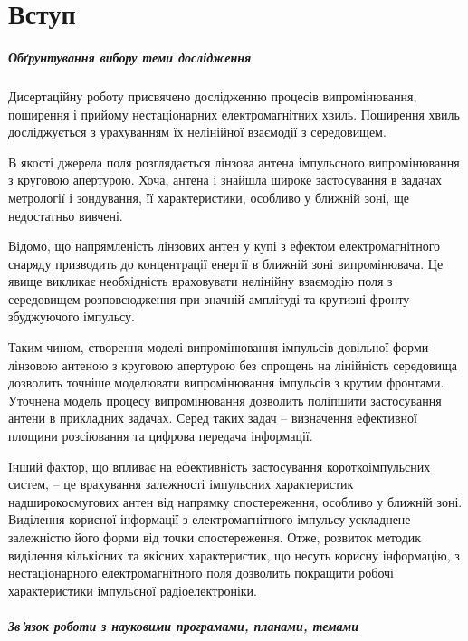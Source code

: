 \chapter*{Вступ}

\paragraph{Обґрунтування вибору теми дослідження}

Дисертаційну роботу присвячено дослідженню процесів випромінювання, поширення 
і прийому нестаціонарних електромагнітних хвиль. Поширення хвиль досліджується 
з урахуванням їх нелінійної взаємодії з середовищем. 

В якості джерела поля розглядається лінзова антена імпульсного випромінювання 
з круговою апертурою. Хоча, антена і знайшла широке застосування в задачах 
метрології і зондування, її характеристики, особливо у ближній зоні, 
ще недостатньо вивчені.

Відомо, що напрямленість лінзових антен у купі з ефектом електромагнітного 
снаряду призводить до концентрації енергії в ближній зоні випромінювача. Це 
явище викликає необхідність враховувати нелінійну взаємодію поля з середовищем 
розповсюдження при значній амплітуді та крутизні фронту збуджуючого імпульсу.

Таким чином, створення моделі випромінювання імпульсів довільної 
форми лінзовою антеною з круговою апертурою без спрощень на лінійність 
середовища дозволить точніше моделювати випромінювання імпульсів з 
крутим фронтами. Уточнена модель процесу випромінювання дозволить поліпшити 
застосування антени в прикладних задачах. Серед таких задач -- визначення 
ефективної площини розсіювання та цифрова передача інформації.

Інший фактор, що впливає на ефективність застосування короткоімпульсних
систем, -- це врахування залежності імпульсних характеристик 
надширокосмугових антен від напрямку спостереження, особливо у ближній зоні. 
Виділення корисної інформації з електромагнітного імпульсу ускладнене 
залежністю його форми від точки спостереження. Отже, 
розвиток методик виділення кількісних та якісних характеристик, що несуть 
корисну інформацію, з нестаціонарного електромагнітного поля дозволить 
покращити робочі характеристики імпульсної радіоелектроніки.

\paragraph{Зв'язок роботи з науковими програмами, планами, темами}

